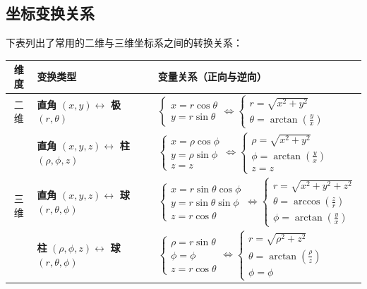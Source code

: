 \documentclass[12pt, a4paper, oneside, UTF8]{ctexbook}
\begin{document}
\subsection{坐标变换关系}
下表列出了常用的二维与三维坐标系之间的转换关系：
\begin{center}
\renewcommand{\arraystretch}{1.8}
\begin{tabular}{|c|l|l|}
\hline
\textbf{维度} & \textbf{变换类型} & \textbf{变量关系（正向与逆向）} \\ \hline
二维 & \textbf{直角} $(x,y) \leftrightarrow$ \textbf{极} $(r,\theta)$ & $\begin{cases} x = r\cos\theta \\ y = r\sin\theta \end{cases} \iff \begin{cases} r = \sqrt{x^2+y^2} \\ \theta = \arctan(\frac{y}{x}) \end{cases}$ \\ \hline \hline
\multirow{3}{*}{三维} & \textbf{直角} $(x,y,z) \leftrightarrow$ \textbf{柱} $(\rho,\phi,z)$ & $\begin{cases} x = \rho\cos\phi \\ y = \rho\sin\phi \\ z = z \end{cases} \iff \begin{cases} \rho = \sqrt{x^2+y^2} \\ \phi = \arctan(\frac{y}{x}) \\ z = z \end{cases}$ \\ \cline{2-3}
 & \textbf{直角} $(x,y,z) \leftrightarrow$ \textbf{球} $(r,\theta,\phi)$ & $\begin{cases} x = r\sin\theta\cos\phi \\ y = r\sin\theta\sin\phi \\ z = r\cos\theta \end{cases} \iff \begin{cases} r = \sqrt{x^2+y^2+z^2} \\ \theta = \arccos(\frac{z}{r}) \\ \phi = \arctan(\frac{y}{x}) \end{cases}$ \\ \cline{2-3}
 & \textbf{柱} $(\rho,\phi,z) \leftrightarrow$ \textbf{球} $(r,\theta,\phi)$ & $\begin{cases} \rho = r\sin\theta \\ \phi = \phi \\ z = r\cos\theta \end{cases} \iff \begin{cases} r = \sqrt{\rho^2+z^2} \\ \theta = \arctan(\frac{\rho}{z}) \\ \phi = \phi \end{cases}$ \\ \hline
\end{tabular}
\end{center}
\end{document}
